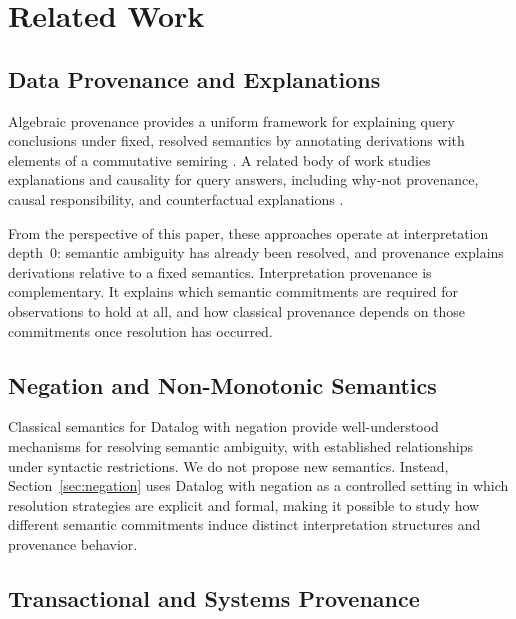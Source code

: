 \documentclass[acmsmall,nonacm]{acmart}
\theoremstyle{remark}
\numberwithin{definition}{section}
\numberwithin{theorem}{section}
\numberwithin{lemma}{section}
\numberwithin{corollary}{section}
\numberwithin{remark}{section}
\numberwithin{example}{section}
\numberwithin{observation}{section}
\numberwithin{assumption}{section}
\begin{document}
\section{Related Work}
\label{sec:related}

\subsection{Data Provenance and Explanations}

Algebraic provenance provides a uniform framework for explaining query
conclusions under fixed, resolved semantics by annotating derivations with
elements of a commutative semiring
\cite{green2007provenance,suciu2011probabilistic,dalvi2012probabilistic,olteanu2015factorized,senellart2018provenance}.
A related body of work studies explanations and causality for query answers,
including why-not provenance, causal responsibility, and counterfactual
explanations
\cite{buneman2001why,halpern2001causes,meliou2010causality,glavic2015survey}.

From the perspective of this paper, these approaches operate at
interpretation depth~0: semantic ambiguity has already been resolved, and
provenance explains derivations relative to a fixed semantics.
Interpretation provenance is complementary.
It explains which semantic commitments are required for observations to hold
at all, and how classical provenance depends on those commitments once
resolution has occurred.

\subsection{Negation and Non-Monotonic Semantics}

Classical semantics for Datalog with negation provide well-understood mechanisms
for resolving semantic ambiguity, with established relationships under syntactic
restrictions.
We do not propose new semantics.
Instead, Section~\ref{sec:negation} uses Datalog with negation as a controlled
setting in which resolution strategies are explicit and formal, making it
possible to study how different semantic commitments induce distinct
interpretation structures and provenance behavior.

\subsection{Transactional and Systems Provenance}
\end{document}
